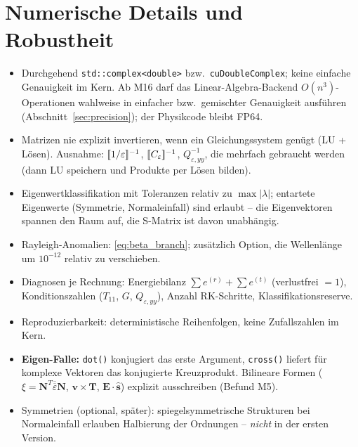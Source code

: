 \section{Numerische Details und Robustheit}\label{sec:numerics}
\begin{itemize}
  \item Durchgehend \verb|std::complex<double>| bzw.\ \verb|cuDoubleComplex|; keine einfache Genauigkeit
        im Kern. Ab M16 darf das Linear-Algebra-Backend $O(n^3)$-Operationen wahlweise in einfacher bzw.\ gemischter
        Genauigkeit ausführen (Abschnitt~\ref{sec:precision}); der Physikcode bleibt FP64.
  \item Matrizen nie explizit invertieren, wenn ein Gleichungssystem genügt (LU + Lösen).
        Ausnahme: $[\![1/\varepsilon]\!]^{-1}$, $[\![C_\varepsilon]\!]^{-1}$, $Q_{\varepsilon,yy}^{-1}$, die mehrfach gebraucht werden
        (dann LU speichern und Produkte per Lösen bilden).
  \item Eigenwertklassifikation mit Toleranzen relativ zu $\max|\lambda|$; entartete Eigenwerte
        (Symmetrie, Normaleinfall) sind erlaubt -- die Eigenvektoren spannen den Raum auf, die
        S-Matrix ist davon unabhängig.
  \item Rayleigh-Anomalien: \eqref{eq:beta_branch}; zusätzlich Option, die Wellenlänge um
        $10^{-12}$ relativ zu verschieben.
  \item Diagnosen je Rechnung: Energiebilanz $\sum e^{(r)}+\sum e^{(t)}$ (verlustfrei $=1$), Konditionszahlen
        ($T_{11}$, $G$, $Q_{\varepsilon,yy}$), Anzahl RK-Schritte, Klassifikationsreserve.
  \item Reproduzierbarkeit: deterministische Reihenfolgen, keine Zufallszahlen im Kern.
  \item \textbf{Eigen-Falle:} \verb|dot()| konjugiert das erste Argument, \verb|cross()| liefert für komplexe
        Vektoren das konjugierte Kreuzprodukt. Bilineare Formen ($\xi=\mathbf N^T\overline{\overline\varepsilon}\mathbf N$,
        $\mathbf v\times\mathbf T$, $\mathbf E\cdot\hat{\mathbf s}$) explizit ausschreiben (Befund M5).
  \item Symmetrien (optional, später): spiegelsymmetrische Strukturen bei Normaleinfall erlauben
        Halbierung der Ordnungen -- \emph{nicht} in der ersten Version.
\end{itemize}

